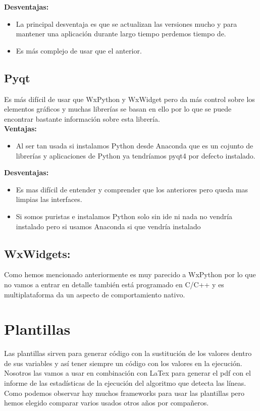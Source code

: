 \textbf{Desventajas:}

\begin{itemize}
\item La principal desventaja es que se actualizan las versiones mucho y para mantener una aplicación durante largo tiempo perdemos tiempo de.
\item Es más complejo de usar que el anterior.
\end{itemize}

\subsection{Pyqt}
Es más difícil de usar que WxPython y WxWidget pero da más control sobre los elementos gráficos y muchas librerías se basan en ello por lo que se puede encontrar bastante información sobre esta librería.
\\

\textbf{Ventajas:}

\begin{itemize}
\item Al ser tan usada si instalamos Python desde Anaconda que es un cojunto de librerías y aplicaciones de Python ya tendríamos pyqt4 por defecto instalado.
\end{itemize}

\textbf{Desventajas:}

\begin{itemize}
\item Es mas difícil de entender y comprender que los anteriores pero queda mas limpias las interfaces.
\item Si somos puristas e instalamos Python solo sin ide ni nada no vendría instalado pero si usamos Anaconda si que vendría instalado
\end{itemize}

\subsection{WxWidgets:}
Como hemos mencionado anteriormente es muy parecido a WxPython por lo que no vamos a entrar en detalle también está programado en C/C++ y es multiplataforma da un aspecto de comportamiento nativo.
\\


\section{Plantillas}
Las plantillas sirven para generar código con la sustitución de los valores dentro de sus variables y así tener siempre un código con los valores en la ejecución.\\
Nosotros las vamos a usar en combinación con LaTex para generar el pdf con el informe de las estadísticas de la ejecución del algoritmo que detecta las líneas.\\
Como podemos observar hay muchos frameworks para usar las plantillas pero hemos elegido comparar varios usados otros años por compañeros.
